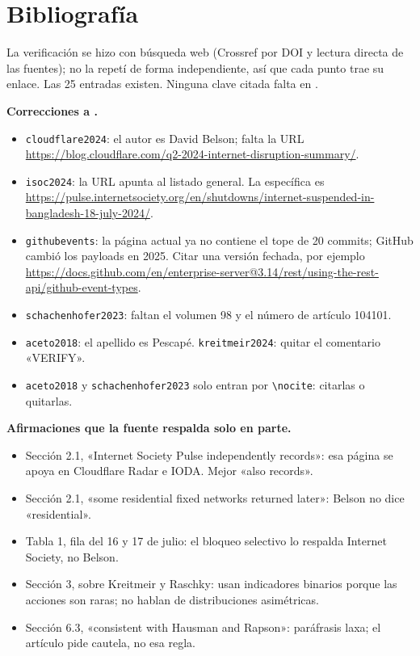 \documentclass[11pt,a4paper]{article}
\newcommand{\cod}[1]{\texttt{#1}}
\begin{document}
\section{Bibliografía}

La verificación se hizo con búsqueda web (Crossref por DOI y lectura directa de las fuentes); no la
repetí de forma independiente, así que cada punto trae su enlace. Las 25 entradas existen. Ninguna
clave citada falta en .

\textbf{Correcciones a .}
\begin{itemize}
\item \cod{cloudflare2024}: el autor es David Belson; falta la URL
\url{https://blog.cloudflare.com/q2-2024-internet-disruption-summary/}.
\item \cod{isoc2024}: la URL apunta al listado general. La específica es
\url{https://pulse.internetsociety.org/en/shutdowns/internet-suspended-in-bangladesh-18-july-2024/}.
\item \cod{githubevents}: la página actual ya no contiene el tope de 20 commits; GitHub cambió los
payloads en 2025. Citar una versión fechada, por ejemplo
\url{https://docs.github.com/en/enterprise-server@3.14/rest/using-the-rest-api/github-event-types}.
\item \cod{schachenhofer2023}: faltan el volumen 98 y el número de artículo 104101.
\item \cod{aceto2018}: el apellido es Pescapé. \cod{kreitmeir2024}: quitar el comentario «VERIFY».
\item \cod{aceto2018} y \cod{schachenhofer2023} solo entran por \cod{\textbackslash nocite}: citarlas
o quitarlas.
\end{itemize}

\textbf{Afirmaciones que la fuente respalda solo en parte.}
\begin{itemize}
\item Sección 2.1, «Internet Society Pulse independently records»: esa página se apoya en Cloudflare
Radar e IODA. Mejor «also records».
\item Sección 2.1, «some residential fixed networks returned later»: Belson no dice «residential».
\item Tabla 1, fila del 16 y 17 de julio: el bloqueo selectivo lo respalda Internet Society, no
Belson.
\item Sección 3, sobre Kreitmeir y Raschky: usan indicadores binarios porque las acciones son raras;
no hablan de distribuciones asimétricas.
\item Sección 6.3, «consistent with Hausman and Rapson»: paráfrasis laxa; el artículo pide cautela,
no esa regla.
\end{itemize}
\end{document}
